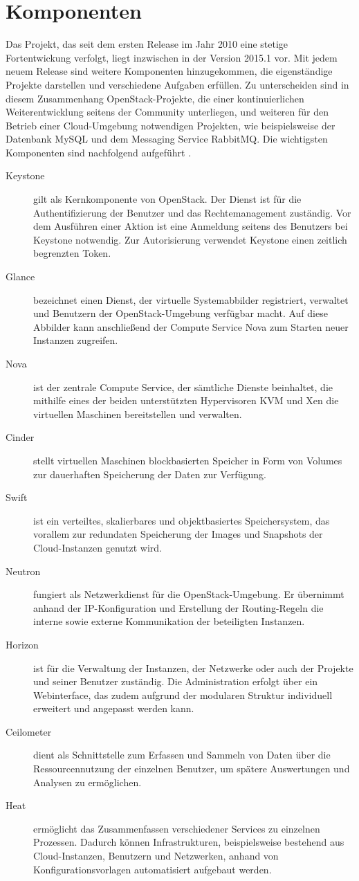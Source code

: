 \section{Komponenten}Das Projekt, das seit dem ersten Release im Jahr 2010 eine stetige Fortentwickung verfolgt, liegt inzwischen in der Version 2015.1 vor. Mit jedem neuem Release sind weitere Komponenten hinzugekommen, die eigenständige Projekte darstellen und verschiedene Aufgaben erfüllen. Zu unterscheiden sind in diesem Zusammenhang OpenStack-Projekte, die einer kontinuierlichen Weiterentwicklung seitens der Community unterliegen, und weiteren für den Betrieb einer Cloud-Umgebung notwendigen Projekten, wie beispielsweise der Datenbank MySQL und dem Messaging Service RabbitMQ. Die wichtigsten Komponenten sind nachfolgend aufgeführt \cite[S. 20-28]{Beitter}.
\begin{description}
\item[Keystone] gilt als Kernkomponente von OpenStack. Der Dienst ist für die Authentifizierung der Benutzer und das Rechtemanagement zuständig. Vor dem Ausführen einer Aktion ist eine Anmeldung seitens des Benutzers bei Keystone notwendig. Zur Autorisierung verwendet Keystone einen zeitlich begrenzten Token.
\item[Glance] bezeichnet einen Dienst, der virtuelle Systemabbilder registriert, verwaltet und Benutzern der OpenStack-Umgebung verfügbar macht. Auf diese Abbilder kann anschließend der Compute Service Nova zum Starten neuer Instanzen zugreifen. 
\item[Nova] ist der zentrale Compute Service, der sämtliche Dienste beinhaltet, die mithilfe eines der beiden unterstützten Hypervisoren KVM und Xen die virtuellen Maschinen bereitstellen und verwalten.
\item[Cinder] stellt virtuellen Maschinen blockbasierten Speicher in Form von Volumes zur dauerhaften Speicherung der Daten zur Verfügung. 
\item[Swift] ist ein verteiltes, skalierbares und objektbasiertes Speichersystem, das vorallem zur redundaten Speicherung der Images und Snapshots der Cloud-Instanzen genutzt wird.
\item[Neutron] fungiert als Netzwerkdienst für die OpenStack-Umgebung. Er übernimmt anhand der IP-Konfiguration und Erstellung der Routing-Regeln die interne sowie externe Kommunikation der beteiligten Instanzen.
\item[Horizon] ist für die Verwaltung der Instanzen, der Netzwerke oder auch der Projekte und seiner Benutzer zuständig. Die Administration erfolgt über ein Webinterface, das zudem aufgrund der modularen Struktur individuell erweitert und angepasst werden kann. 
\item[Ceilometer] dient als Schnittstelle zum Erfassen und Sammeln von Daten über die Ressourcennutzung der einzelnen Benutzer, um spätere Auswertungen und Analysen zu ermöglichen.
\item[Heat] ermöglicht das Zusammenfassen verschiedener Services zu einzelnen Prozessen. Dadurch können Infrastrukturen, beispielsweise bestehend aus Cloud-Instanzen, Benutzern und Netzwerken, anhand von Konfigurationsvorlagen automatisiert aufgebaut werden.
\end{description}
